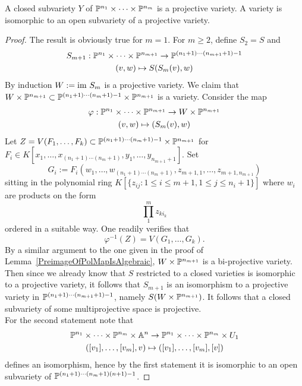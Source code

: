     \begin{proposition}\label{VarietiesAreProjective}
        A closed subvariety $Y$ of $\mathbb{P}^{n_1}\times\cdots\times\mathbb{P}^{n_m}$ is a projective variety. A variety is isomorphic to an open subvariety of a projective variety.
    \end{proposition}
    \begin{proof}
        The result is obviously true for $m=1$. For $m\geq 2$, define $S_2 = S$ and 
        \begin{gather*}
            S_{m+1} : \mathbb{P}^{n_1}\times \cdots \times \mathbb{P}^{n_{m+1}}\rightarrow 
            \mathbb{P}^{(n_1+1)\cdots (n_{m+1}+1)-1}\\
            (v,w)\mapsto S(S_m(v),w)
        \end{gather*}
        By induction $W:=\im \ S_m$ is a projective variety. We claim that $W\times \mathbb{P}^{n_{m+1}}\subset \mathbb{P}^{(n_1+1)\cdots (n_m+1)-1}\times \mathbb{P}^{n_{m+1}}$ is a variety. Consider the map 
        \begin{gather*}
            \varphi: \mathbb{P}^{n_1}\times \cdots \times \mathbb{P}^{n_{m+1}} \rightarrow W\times \mathbb{P}^{n_{m+1}}\\
            (v,w)\mapsto (S_m(v),w)
        \end{gather*}
        Let $Z=V(F_1,\dots,F_k)\subset \mathbb{P}^{(n_1+1)\cdots(n_m+1)-1}\times \mathbb{P}^{n_{m+1}}$ for $F_i\in K[x_1,\dots,x_{(n_1+1)\cdots(n_m+1)}, y_1,\dots,y_{n_{m+1}+1}] $. Set $$G_i:=F_i(w_1,\dots,w_{(n_1+1)\cdots(n_m+1)},z_{m+1,1},\dots,z_{m+1,n_{m+1}})$$
        sitting in the polynomial ring $K[\{z_{ij} : 1\leq i\leq m+1, 1\leq j\leq n_i+1\}]$ where $w_i$ are products on the form 
        $$\prod_1^m z_{ki_k}$$
        ordered in a suitable way. One readily verifies that 
        $$\varphi^{-1}(Z)=V(G_1,\dots,G_k).$$
        By a similar argument to the one given in the proof of Lemma~\ref{PreimageOfPolMapIsAlgebraic}, $W\times \mathbb{P}^{n_{m+1}}$ is a bi-projective variety. Then since we already know that $S$ restricted to a closed varieties is isomorphic to a projective variety, it follows that $S_{m+1}$ is an isomorphism to a projective variety in $\mathbb{P}^{(n_1+1)\cdots(n_{m+1}+1)-1}$, namely $S(W\times \mathbb{P}^{n_{m+1}})$. It follows that a closed subvariety of some multiprojective space is projective.\\    
        For the second statement note that 
        \begin{gather*}
            \mathbb{P}^{n_1}\times \cdots \times \mathbb{P}^{n_m}\times \mathbb{A}^n \rightarrow \mathbb{P}^{n_1}\times \cdots \times \mathbb{P}^{n_m} \times U_1\\
            ([v_1],\dots,[v_m],v)\mapsto ([v_1],\dots,[v_m],[v])
        \end{gather*}
        defines an isomorphism, hence by the first statement it is isomorphic to an open subvariety of $\mathbb{P}^{(n_1+1)\cdots(n_m+1)(n+1)-1}$. 
    \end{proof}
